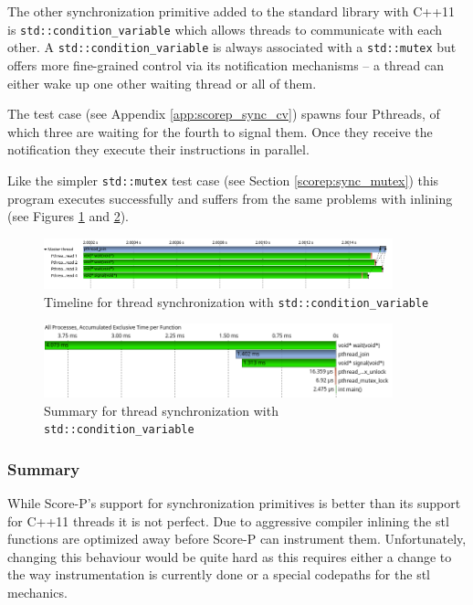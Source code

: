The other synchronization primitive added to the standard library with C++11 is \texttt{std::condition\_variable} which allows threads to communicate with each other. A \texttt{std::condition\_variable} is always associated with a \texttt{std::mutex} but offers more fine-grained control via its notification mechanisms -- a thread can either wake up one other waiting thread or all of them.

The test case (see Appendix \ref{app:scorep_sync_cv}) spawns four Pthreads, of which three are waiting for the fourth to signal them. Once they receive the notification they execute their instructions in parallel.

Like the simpler \texttt{std::mutex} test case (see Section \ref{scorep:sync_mutex}) this program executes successfully and suffers from the same problems with inlining (see Figures \ref{scorep:sync_pthread_cv_timeline} and \ref{scorep:sync_pthread_cv_summary}).

\begin{figure}[htbp]
	\begin{center}
		\includegraphics[width=0.9\textwidth]{img/scorep_pthread_cv_timeline.png}
		\caption{Timeline for thread synchronization with \texttt{std::condition\_variable}}
		\label{scorep:sync_pthread_cv_timeline}
	\end{center}
\end{figure}

\begin{figure}[htbp]
	\begin{center}
		\includegraphics[width=0.9\textwidth]{img/scorep_pthread_cv_summary.png}
		\caption{Summary for thread synchronization with \texttt{std::condition\_variable}}
		\label{scorep:sync_pthread_cv_summary}
	\end{center}
\end{figure}

\subsubsection{Summary}

While Score-P's support for synchronization primitives is better than its support for C++11 threads it is not perfect. Due to aggressive compiler inlining the \gls{stl} functions are optimized away before Score-P can instrument them. Unfortunately, changing this behaviour would be quite hard as this requires either a change to the way instrumentation is currently done or a special codepaths for the \gls{stl} mechanics.
